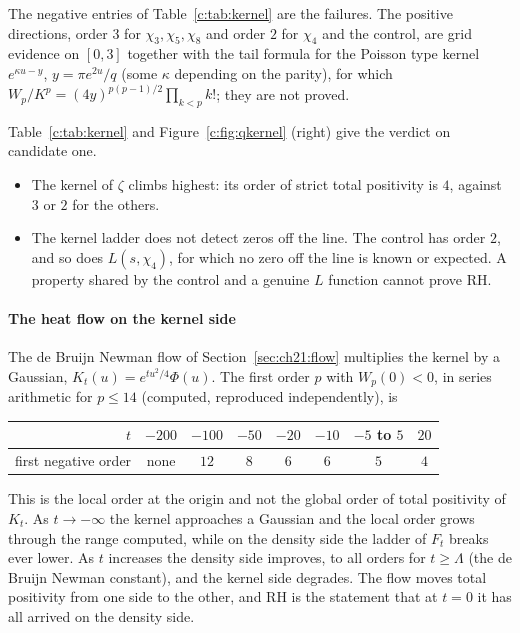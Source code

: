 The negative entries of Table~\ref{c:tab:kernel} are the failures. The positive directions, order $3$ for $\chi_3,\chi_5,\chi_8$ and order $2$ for $\chi_4$ and the control, are grid evidence on $[0,3]$ together with the tail formula for the Poisson type kernel $e^{\kappa u-y}$, $y=\pi e^{2u}/q$ (some $\kappa$ depending on the parity), for which $W_p/K^p=(4y)^{p(p-1)/2}\prod_{k<p}k!$; they are not proved.

Table~\ref{c:tab:kernel} and Figure~\ref{c:fig:qkernel} (right) give the verdict on candidate one.
\begin{itemize}
\item The kernel of $\zeta$ climbs highest: its order of strict total positivity is $4$, against $3$ or $2$ for the others.
\item The kernel ladder does not detect zeros off the line. The control has order $2$, and so does $L(s,\chi_4)$, for which no zero off the line is known or expected. A property shared by the control and a genuine $L$ function cannot prove RH.
\end{itemize}

\paragraph{The heat flow on the kernel side} The de Bruijn Newman flow of Section~\ref{sec:ch21:flow} multiplies the kernel by a Gaussian, $K_t(u)=e^{tu^2/4}\Phi(u)$. The first order $p$ with $W_p(0)<0$, in series arithmetic for $p\le14$ (computed, reproduced independently), is
\begin{center}
\footnotesize
\begin{tabular}{rccccccc}
\toprule
$t$ & $-200$ & $-100$ & $-50$ & $-20$ & $-10$ & $-5$ to $5$ & $20$\\
\midrule
first negative order & none & $12$ & $8$ & $6$ & $6$ & $5$ & $4$\\
\bottomrule
\end{tabular}
\end{center}
This is the local order at the origin and not the global order of total positivity of $K_t$. As $t\to-\infty$ the kernel approaches a Gaussian and the local order grows through the range computed, while on the density side the ladder of $F_t$ breaks ever lower. As $t$ increases the density side improves, to all orders for $t\ge\Lambda$ (the de Bruijn Newman constant), and the kernel side degrades. The flow moves total positivity from one side to the other, and RH is the statement that at $t=0$ it has all arrived on the density side.

